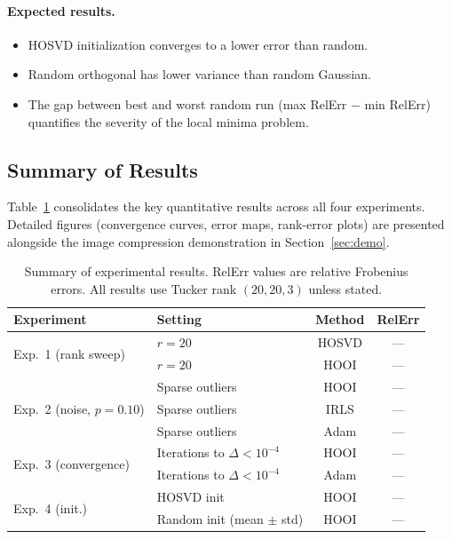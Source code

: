 \paragraph{Expected results.}
\begin{itemize}
  \item HOSVD initialization converges to a lower error than random.
  \item Random orthogonal has lower variance than random Gaussian.
  \item The gap between best and worst random run (max RelErr $-$ min RelErr)
        quantifies the severity of the local minima problem.
\end{itemize}

\subsection{Summary of Results}
\label{subsec:exp_summary}

Table~\ref{tab:exp_summary} consolidates the key quantitative results
across all four experiments.
Detailed figures (convergence curves, error maps, rank-error plots)
are presented alongside the image compression demonstration in
Section~\ref{sec:demo}.

\begin{table}[h]
  \centering
  \caption{Summary of experimental results.
           RelErr values are relative Frobenius errors.
           All results use Tucker rank $(20, 20, 3)$ unless stated.}
  \label{tab:exp_summary}
  \begin{tabular}{llcc}
    \toprule
    Experiment & Setting & Method & RelErr \\
    \midrule
    \multirow{2}{*}{Exp.\ 1 (rank sweep)}
      & $r = 20$  & HOSVD & --- \\
      & $r = 20$  & HOOI  & --- \\
    \midrule
    \multirow{3}{*}{Exp.\ 2 (noise, $p=0.10$)}
      & Sparse outliers & HOOI  & --- \\
      & Sparse outliers & IRLS  & --- \\
      & Sparse outliers & Adam  & --- \\
    \midrule
    \multirow{2}{*}{Exp.\ 3 (convergence)}
      & Iterations to $\Delta < 10^{-4}$ & HOOI & --- \\
      & Iterations to $\Delta < 10^{-4}$ & Adam & --- \\
    \midrule
    \multirow{2}{*}{Exp.\ 4 (init.)}
      & HOSVD init & HOOI & --- \\
      & Random init (mean $\pm$ std) & HOOI & --- \\
    \bottomrule
  \end{tabular}
\end{table}

